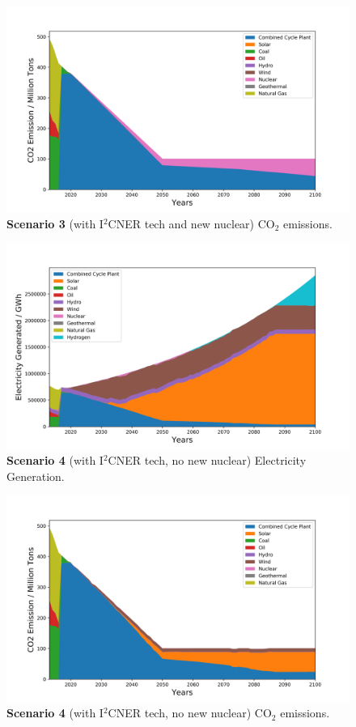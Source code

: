 \documentclass[final]{beamer}
\newlength{\onecolwid}
\begin{document}
\begin{frame}[t]
\begin{columns}
\begin{column}{\onecolwid}
\begin{figure}[H] 
\centering
\includegraphics[scale=1.1]{./plots/i2cnerNuc_co2.png}
\caption{\textbf{Scenario 3} (with I$^2$CNER tech and new nuclear) CO$_2$ emissions.}
\label{s3c}
\end{figure}


\begin{figure}[H] 
\centering
\includegraphics[scale=1.1]{./plots/i2cnerNoNuc_ele.png}
\caption{\textbf{Scenario 4} (with I$^2$CNER tech, no new nuclear) Electricity Generation.}
\label{s4e}
\end{figure}

\begin{figure}[H] 
\centering
\includegraphics[scale=1.1]{./plots/i2cnerNoNuc_co2.png}
\caption{\textbf{Scenario 4} (with I$^2$CNER tech, no new nuclear) CO$_2$ emissions.}
\label{s4c}
\end{figure}


\end{column}
\end{columns}
\end{frame}
\end{document}
